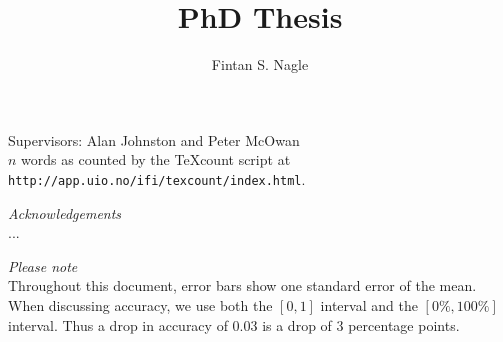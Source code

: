 \documentclass[a4paper]{report}
\title{PhD Thesis}
\author{Fintan S. Nagle}
\begin{document}
\maketitle

\begin{center}
Supervisors: Alan Johnston and Peter McOwan
\\
$n$ words as counted by  the TeXcount script at \texttt{http://app.uio.no/ifi/texcount/index.html}.
\vspace{3cm}


\vspace{3cm}

\textit{Acknowledgements}\\
...


\end{center}


\pagebreak

\vspace{10cm}
\begin{center}
\textit{Please note}\\
Throughout this document, error bars show one standard error of the mean.\\
When discussing accuracy, we use both the $[0,1]$ interval and the $[0\%,100\%]$ interval. Thus a drop in accuracy of 0.03 is a drop of 3 percentage points.
\end{center}

\pagebreak

\tableofcontents

\pagebreak
































\begin{singlespace}
\begin{footnotesize}
\begin{twocolumn}


\end{twocolumn}
\end{footnotesize}
\end{singlespace}
\newpage


\end{document}

